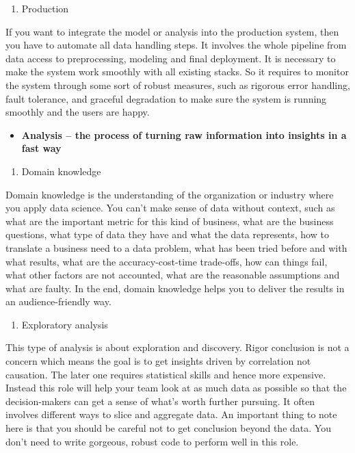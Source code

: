 \documentclass[12pt,]{krantz}
\providecommand{\tightlist}{%
  \setlength{\itemsep}{0pt}\setlength{\parskip}{0pt}}
\theoremstyle{definition}
\theoremstyle{definition}
\theoremstyle{definition}
\theoremstyle{remark}
\begin{document}
\begin{enumerate}
\def\labelenumi{(\arabic{enumi})}
\setcounter{enumi}{2}
\tightlist
\item
  Production
\end{enumerate}

If you want to integrate the model or analysis into the production
system, then you have to automate all data handling steps. It involves
the whole pipeline from data access to preprocessing, modeling and final
deployment. It is necessary to make the system work smoothly with all
existing stacks. So it requires to monitor the system through some sort
of robust measures, such as rigorous error handling, fault tolerance,
and graceful degradation to make sure the system is running smoothly and
the users are happy.

\begin{itemize}
\tightlist
\item
  \textbf{Analysis -- the process of turning raw information into
  insights in a fast way}
\end{itemize}

\begin{enumerate}
\def\labelenumi{(\arabic{enumi})}
\tightlist
\item
  Domain knowledge
\end{enumerate}

Domain knowledge is the understanding of the organization or industry
where you apply data science. You can't make sense of data without
context, such as what are the important metric for this kind of
business, what are the business questions, what type of data they have
and what the data represents, how to translate a business need to a data
problem, what has been tried before and with what results, what are the
accuracy-cost-time trade-offs, how can things fail, what other factors
are not accounted, what are the reasonable assumptions and what are
faulty. In the end, domain knowledge helps you to deliver the results in
an audience-friendly way.

\begin{enumerate}
\def\labelenumi{(\arabic{enumi})}
\setcounter{enumi}{1}
\tightlist
\item
  Exploratory analysis
\end{enumerate}

This type of analysis is about exploration and discovery. Rigor
conclusion is not a concern which means the goal is to get insights
driven by correlation not causation. The later one requires statistical
skills and hence more expensive. Instead this role will help your team
look at as much data as possible so that the decision-makers can get a
sense of what's worth further pursuing. It often involves different ways
to slice and aggregate data. An important thing to note here is that you
should be careful not to get conclusion beyond the data. You don't need
to write gorgeous, robust code to perform well in this role.
\end{document}
